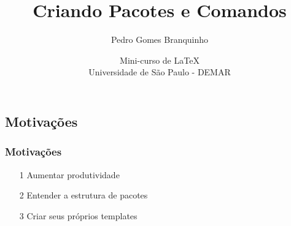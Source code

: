 \documentclass{beamer}
\title[Relatórios]{\Huge{Criando Pacotes e Comandos}}
\author[Branquinho]{Pedro Gomes Branquinho \\
  \text{\scriptsize{pedro.branquinho@usp.br}}}
\date[ABNTeX]{\scriptsize{Mini-curso de \LaTeX \\ Universidade de São Paulo - DEMAR}}
\begin{document}
{
  \begin{frame}
    \titlepage
  \end{frame}
}



\begin{frame}
  \section{Motivações}
  \frametitle{Motivações}

  \begin{enumerate}
  \item[1] Aumentar produtividade
  \item[2] Entender a estrutura de pacotes
  \item[3] Criar seus próprios templates
  \end{enumerate}

\end{frame}
\end{document}
